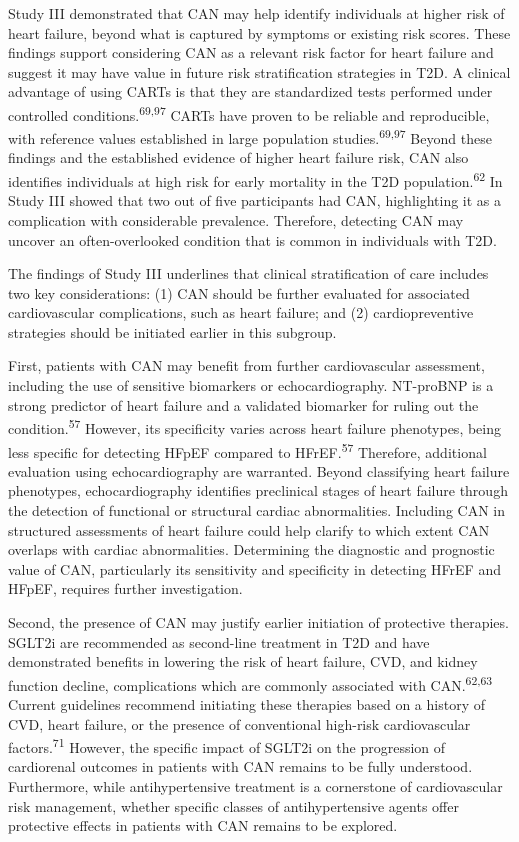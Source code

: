 \documentclass[
  a4paper,
  headsepline=true,
  open=left]{scrbook}
\begin{document}
Study III demonstrated that CAN may help identify individuals at higher
risk of heart failure, beyond what is captured by symptoms or existing
risk scores. These findings support considering CAN as a relevant risk
factor for heart failure and suggest it may have value in future risk
stratification strategies in T2D. A clinical advantage of using CARTs is
that they are standardized tests performed under controlled
conditions.\textsuperscript{69,97} CARTs have proven to be reliable and
reproducible, with reference values established in large population
studies.\textsuperscript{69,97} Beyond these findings and the
established evidence of higher heart failure risk, CAN also identifies
individuals at high risk for early mortality in the T2D
population.\textsuperscript{62} In Study III showed that two out of five
participants had CAN, highlighting it as a complication with
considerable prevalence. Therefore, detecting CAN may uncover an
often-overlooked condition that is common in individuals with T2D.

The findings of Study III underlines that clinical stratification of
care includes two key considerations: (1) CAN should be further
evaluated for associated cardiovascular complications, such as heart
failure; and (2) cardiopreventive strategies should be initiated earlier
in this subgroup.

First, patients with CAN may benefit from further cardiovascular
assessment, including the use of sensitive biomarkers or
echocardiography. NT-proBNP is a strong predictor of heart failure and a
validated biomarker for ruling out the condition.\textsuperscript{57}
However, its specificity varies across heart failure phenotypes, being
less specific for detecting HFpEF compared to HFrEF.\textsuperscript{57}
Therefore, additional evaluation using echocardiography are warranted.
Beyond classifying heart failure phenotypes, echocardiography identifies
preclinical stages of heart failure through the detection of functional
or structural cardiac abnormalities. Including CAN in structured
assessments of heart failure could help clarify to which extent CAN
overlaps with cardiac abnormalities. Determining the diagnostic and
prognostic value of CAN, particularly its sensitivity and specificity in
detecting HFrEF and HFpEF, requires further investigation.

Second, the presence of CAN may justify earlier initiation of protective
therapies. SGLT2i are recommended as second-line treatment in T2D and
have demonstrated benefits in lowering the risk of heart failure, CVD,
and kidney function decline, complications which are commonly associated
with CAN.\textsuperscript{62,63} Current guidelines recommend initiating
these therapies based on a history of CVD, heart failure, or the
presence of conventional high-risk cardiovascular
factors.\textsuperscript{71} However, the specific impact of SGLT2i on
the progression of cardiorenal outcomes in patients with CAN remains to
be fully understood. Furthermore, while antihypertensive treatment is a
cornerstone of cardiovascular risk management, whether specific classes
of antihypertensive agents offer protective effects in patients with CAN
remains to be explored.
\end{document}
